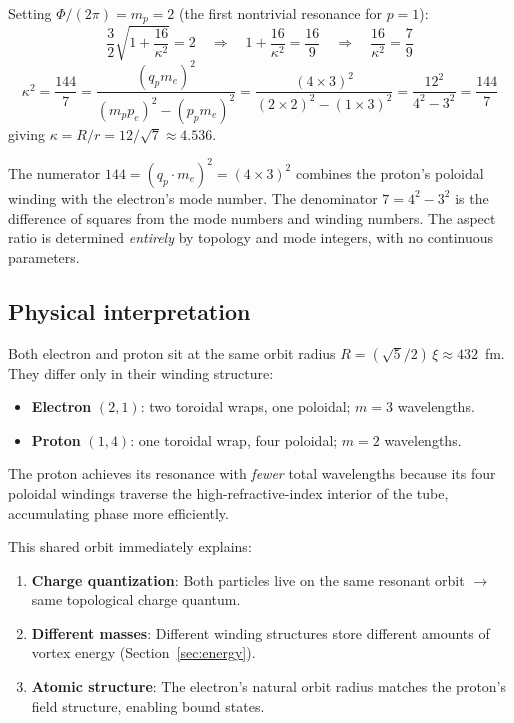 \documentclass[11pt,a4paper]{article}
\begin{document}
Setting $\Phi/(2\pi) = m_p = 2$ (the first nontrivial resonance
for $p = 1$):
\begin{equation}
  \frac{3}{2}\sqrt{1 + \frac{16}{\kappa^2}} = 2
  \quad\Longrightarrow\quad
  1 + \frac{16}{\kappa^2} = \frac{16}{9}
  \quad\Longrightarrow\quad
  \frac{16}{\kappa^2} = \frac{7}{9}
\end{equation}
\begin{equation}
  \boxed{\kappa^2 = \frac{144}{7} = \frac{(q_p m_e)^2}{(m_p p_e)^2 - (p_p m_e)^2}
  = \frac{(4 \times 3)^2}{(2 \times 2)^2 - (1 \times 3)^2}
  = \frac{12^2}{4^2 - 3^2} = \frac{144}{7}}
  \label{eq:kappa}
\end{equation}
giving $\kappa = R/r = 12/\sqrt{7} \approx 4.536$.

The numerator $144 = (q_p \cdot m_e)^2 = (4 \times 3)^2$ combines
the proton's poloidal winding with the electron's mode number.  The
denominator $7 = 4^2 - 3^2$ is the difference of squares from the
mode numbers and winding numbers.  The aspect ratio is determined
\emph{entirely} by topology and mode integers, with no continuous
parameters.


\subsection{Physical interpretation}

Both electron and proton sit at the same orbit radius
$R = (\sqrt{5}/2)\,\xi \approx 432$~fm.  They differ only in
their winding structure:
\begin{itemize}
  \item \textbf{Electron} $(2,1)$: two toroidal wraps, one poloidal;
    $m = 3$ wavelengths.
  \item \textbf{Proton} $(1,4)$: one toroidal wrap, four poloidal;
    $m = 2$ wavelengths.
\end{itemize}
The proton achieves its resonance with \emph{fewer} total wavelengths
because its four poloidal windings traverse the high-refractive-index
interior of the tube, accumulating phase more efficiently.

This shared orbit immediately explains:
\begin{enumerate}
  \item \textbf{Charge quantization}: Both particles live on the same
    resonant orbit $\to$ same topological charge quantum.
  \item \textbf{Different masses}: Different winding structures store
    different amounts of vortex energy (Section~\ref{sec:energy}).
  \item \textbf{Atomic structure}: The electron's natural orbit radius
    matches the proton's field structure, enabling bound states.
\end{enumerate}
\end{document}
